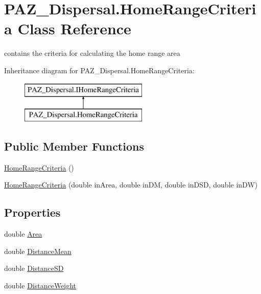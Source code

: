 \hypertarget{class_p_a_z___dispersal_1_1_home_range_criteria}{\section{P\-A\-Z\-\_\-\-Dispersal.\-Home\-Range\-Criteria Class Reference}
\label{class_p_a_z___dispersal_1_1_home_range_criteria}
}


contains the criteria for calculating the home range area  


Inheritance diagram for P\-A\-Z\-\_\-\-Dispersal.\-Home\-Range\-Criteria\-:\begin{figure}[H]
\begin{center}
\leavevmode
\includegraphics[height=2.000000cm]{class_p_a_z___dispersal_1_1_home_range_criteria}
\end{center}
\end{figure}
\subsection*{Public Member Functions}
\begin{DoxyCompactItemize}
\item 
\hyperlink{class_p_a_z___dispersal_1_1_home_range_criteria_a97dc1327de4c4a6f64f0b79372735b39}{Home\-Range\-Criteria} ()
\item 
\hyperlink{class_p_a_z___dispersal_1_1_home_range_criteria_a191158df06b967d12a56f68e1d4fa594}{Home\-Range\-Criteria} (double in\-Area, double in\-D\-M, double in\-D\-S\-D, double in\-D\-W)
\end{DoxyCompactItemize}
\subsection*{Properties}
\begin{DoxyCompactItemize}
\item 
double \hyperlink{class_p_a_z___dispersal_1_1_home_range_criteria_a1b4f1c40321c85bdb879c7eb25bce5d9}{Area}
\item 
double \hyperlink{class_p_a_z___dispersal_1_1_home_range_criteria_ac91eed790c077fda920b0c4b7d876991}{Distance\-Mean}
\item 
double \hyperlink{class_p_a_z___dispersal_1_1_home_range_criteria_ac60d9be3b10f2dab5f3bc0c9c4dd7e17}{Distance\-S\-D}
\item 
double \hyperlink{class_p_a_z___dispersal_1_1_home_range_criteria_a8213178ab0bcc15dadc5039ed7f4c2dc}{Distance\-Weight}
\end{DoxyCompactItemize}


